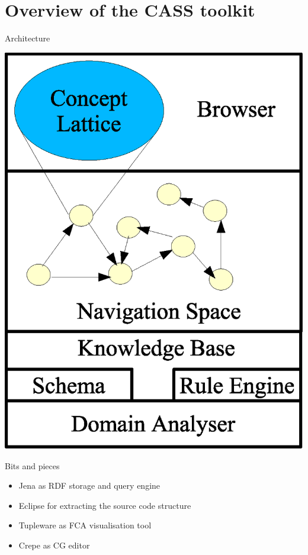 \documentclass[pdf,prettybox]{prosper}
\begin{document}
\part{Overview of the CASS toolkit}

\begin{slide}{Architecture}
\begin{center}
 \includegraphics[height=0.8 \textheight]{img/system1.eps}
\end{center}
\end{slide}

\begin{slide}{Bits and pieces}
\begin{itemize}
 \item Jena as RDF storage and query engine
 \item Eclipse for extracting the source code structure
 \item Tupleware as FCA visualisation tool
 \item Crepe as CG editor
\end{itemize}
\end{slide}
\end{document}
